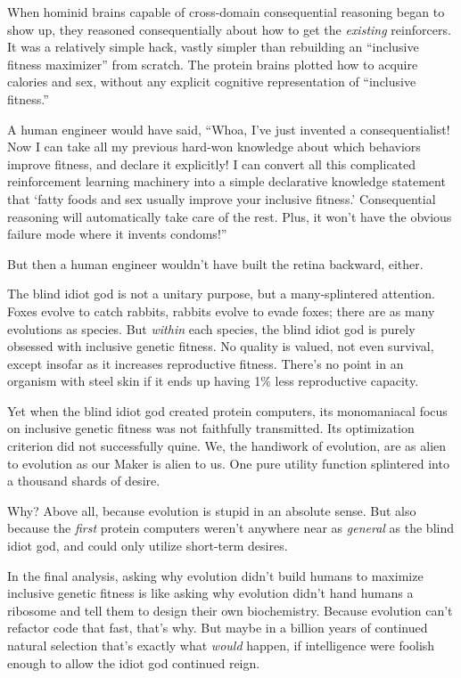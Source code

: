 {
 When hominid brains capable of cross-domain consequential
reasoning began to show up, they reasoned consequentially about how to
get the \textit{existing} reinforcers. It was a relatively simple hack,
vastly simpler than rebuilding an ``inclusive fitness
maximizer'' from scratch. The protein brains plotted
how to acquire calories and sex, without any explicit cognitive
representation of ``inclusive
fitness.''}

{
 A human engineer would have said, ``Whoa,
I've just invented a consequentialist! Now I can take
all my previous hard-won knowledge about which behaviors improve
fitness, and declare it explicitly! I can convert all this complicated
reinforcement learning machinery into a simple declarative knowledge
statement that `fatty foods and sex usually improve your
inclusive fitness.' Consequential reasoning will
automatically take care of the rest. Plus, it won't
have the obvious failure mode where it invents
condoms!''}

{
 But then a human engineer wouldn't have built the
retina backward, either.}

{
 The blind idiot god is not a unitary purpose, but a
many-splintered attention. Foxes evolve to catch rabbits, rabbits
evolve to evade foxes; there are as many evolutions as species. But
\textit{within} each species, the blind idiot god is purely obsessed
with inclusive genetic fitness. No quality is valued, not even
survival, except insofar as it increases reproductive fitness.
There's no point in an organism with steel skin if it
ends up having 1\% less reproductive capacity.}

{
 Yet when the blind idiot god created protein computers, its
monomaniacal focus on inclusive genetic fitness was not faithfully
transmitted. Its optimization criterion did not successfully quine. We,
the handiwork of evolution, are as alien to evolution as our Maker is
alien to us. One pure utility function splintered into a thousand
shards of desire.}

{
 Why? Above all, because evolution is stupid in an absolute sense.
But also because the \textit{first} protein computers
weren't anywhere near as \textit{general} as the blind
idiot god, and could only utilize short-term desires.}

{
 In the final analysis, asking why evolution didn't
build humans to maximize inclusive genetic fitness is like asking why
evolution didn't hand humans a ribosome and tell them
to design their own biochemistry. Because evolution
can't refactor code that fast, that's
why. But maybe in a billion years of continued natural selection
that's exactly what \textit{would} happen, if
intelligence were foolish enough to allow the idiot god continued
reign.}

